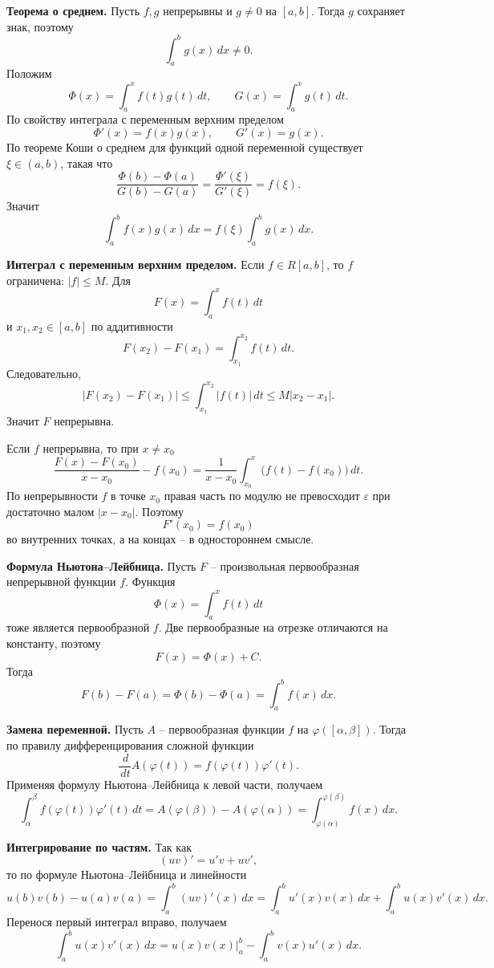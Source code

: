 \documentclass[12pt,a4paper]{article}
\newcommand{\eps}{\varepsilon}
\newcommand{\dd}{\,d}
\begin{document}
\textbf{Теорема о среднем.}
Пусть \(f,g\) непрерывны и \(g\ne0\) на \([a,b]\). Тогда \(g\) сохраняет знак,
поэтому
\[
  \int_a^b g(x)\dd x\ne0.
\]
Положим
\[
  \Phi(x)=\int_a^x f(t)g(t)\dd t,\qquad
  G(x)=\int_a^x g(t)\dd t.
\]
По свойству интеграла с переменным верхним пределом
\[
  \Phi'(x)=f(x)g(x),\qquad G'(x)=g(x).
\]
По теореме Коши о среднем для функций одной переменной существует
\(\xi\in(a,b)\), такая что
\[
  \frac{\Phi(b)-\Phi(a)}{G(b)-G(a)}
  =
  \frac{\Phi'(\xi)}{G'(\xi)}
  =
  f(\xi).
\]
Значит
\[
  \int_a^b f(x)g(x)\dd x
  =
  f(\xi)\int_a^b g(x)\dd x.
\]

\textbf{Интеграл с переменным верхним пределом.}
Если \(f\in R[a,b]\), то \(f\) ограничена: \(|f|\le M\). Для
\[
  F(x)=\int_a^x f(t)\dd t
\]
и \(x_1,x_2\in[a,b]\) по аддитивности
\[
  F(x_2)-F(x_1)=\int_{x_1}^{x_2}f(t)\dd t.
\]
Следовательно,
\[
  |F(x_2)-F(x_1)|
  \le
  \int_{x_1}^{x_2}|f(t)|\dd t
  \le
  M|x_2-x_1|.
\]
Значит \(F\) непрерывна.

Если \(f\) непрерывна, то при \(x\ne x_0\)
\[
  \frac{F(x)-F(x_0)}{x-x_0}-f(x_0)
  =
  \frac{1}{x-x_0}\int_{x_0}^x\bigl(f(t)-f(x_0)\bigr)\dd t.
\]
По непрерывности \(f\) в точке \(x_0\) правая часть по модулю не превосходит
\(\eps\) при достаточно малом \(|x-x_0|\). Поэтому
\[
  F'(x_0)=f(x_0)
\]
во внутренних точках, а на концах -- в одностороннем смысле.

\textbf{Формула Ньютона--Лейбница.}
Пусть \(F\) -- произвольная первообразная непрерывной функции \(f\). Функция
\[
  \Phi(x)=\int_a^x f(t)\dd t
\]
тоже является первообразной \(f\). Две первообразные на отрезке отличаются на
константу, поэтому
\[
  F(x)=\Phi(x)+C.
\]
Тогда
\[
  F(b)-F(a)=\Phi(b)-\Phi(a)=\int_a^b f(x)\dd x.
\]

\textbf{Замена переменной.}
Пусть \(A\) -- первообразная функции \(f\) на \(\varphi([\alpha,\beta])\).
Тогда по правилу дифференцирования сложной функции
\[
  \frac{\dd}{\dd t}A(\varphi(t))
  =
  f(\varphi(t))\varphi'(t).
\]
Применяя формулу Ньютона--Лейбница к левой части, получаем
\[
  \int_\alpha^\beta f(\varphi(t))\varphi'(t)\dd t
  =
  A(\varphi(\beta))-A(\varphi(\alpha))
  =
  \int_{\varphi(\alpha)}^{\varphi(\beta)} f(x)\dd x.
\]

\textbf{Интегрирование по частям.}
Так как
\[
  (uv)'=u'v+uv',
\]
то по формуле Ньютона--Лейбница и линейности
\[
  u(b)v(b)-u(a)v(a)
  =
  \int_a^b (uv)'(x)\dd x
  =
  \int_a^b u'(x)v(x)\dd x+\int_a^b u(x)v'(x)\dd x.
\]
Перенося первый интеграл вправо, получаем
\[
  \int_a^b u(x)v'(x)\dd x
  =
  u(x)v(x)\Big|_a^b-\int_a^b v(x)u'(x)\dd x.
\]
\end{document}

